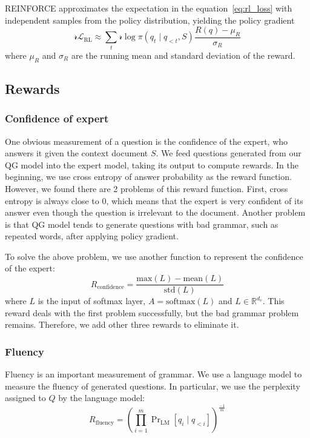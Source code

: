 \documentclass{article}
\begin{document}
REINFORCE approximates the expectation in the equation~\ref{eq:rl_loss} with independent samples from the policy distribution, yielding the policy gradient
\begin{equation}
    \mathcal{rL}_{\text{RL}}\approx\sum_{t}\mathcal{r}\log\pi(q_t \mid q_{<t}, S)\frac{R(q)-\mu_R}{\sigma_R}
\end{equation}
where $\mu_{R}$ and $\sigma_{R}$ are the running mean and standard deviation of the reward.
\subsection{Rewards}
\subsubsection{Confidence of expert}
One obvious measurement of a question is the confidence of the expert, who answers it given the context document $S$. We feed questions generated from our QG model into the expert model, taking its output to compute rewards. In the beginning, we use cross entropy of answer probability as the reward function. 
However, we found there are 2 problems of this reward function. First, cross entropy is always close to 0, which means that the expert is very confident of its answer even though the question is irrelevant to the document. Another problem is that QG model tends to generate questions with bad grammar, such as repeated words, after applying policy gradient.

To solve the above problem, we use another function to represent the confidence of the expert:
\begin{equation}
    R_{\text{confidence}}=\frac{\text{max}(L)-\text{mean}(L)}{\text{std}(L)}
\end{equation}
where $L$ is the input of softmax layer, $A=\text{softmax}(L)$ and $L \in \mathbb{R}^{d_v}$. This reward deals with the first problem successfully, but the bad grammar problem remains. Therefore, we add other three rewards to eliminate it.

\subsubsection{Fluency}
Fluency is an important measurement of grammar. We use a language model to measure the fluency of generated questions. In particular, we use the perplexity assigned to $Q$ by the language model: 
\begin{equation}
    R_{\text{fluency}}=\left(\prod_{i=1}^{m}\Pr\nolimits_{\text{LM}}\left[q_i \mid q_{<i}\right]\right)^{\frac{-1}{m}}
\end{equation}
\end{document}

